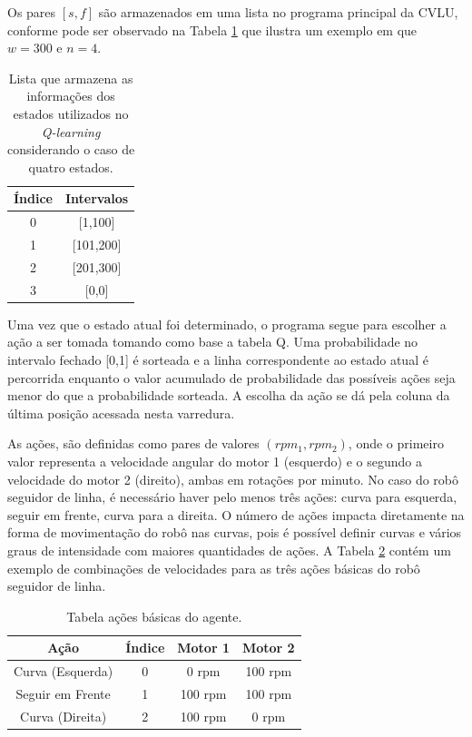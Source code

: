 \documentclass[a4paper]{ifacconf}
\begin{document}
Os pares $[s,f]$ são armazenados em uma lista no programa principal da CVLU, conforme pode ser observado na Tabela \ref{tab:statesOnMemory} que ilustra um exemplo em que $w = 300$ e $n = 4$.

\begin{table}
\centering
\ABNTEXfontereduzida
\caption{Lista que armazena as informações dos estados utilizados no \textit{Q-learning} considerando o caso de quatro estados.} \label{tab:statesOnMemory}
\begin{tabular}{cc}
Índice & Intervalos\\ \hline
0 & [1,100]\\ 
1 & [101,200]\\ 
2 & [201,300] \\ 
3 & [0,0]\\ \hline
\end{tabular}
\end{table}

Uma vez que o estado atual foi determinado, o programa segue para escolher a ação a ser tomada tomando como base a tabela Q. Uma probabilidade no intervalo fechado [0,1] é sorteada e a linha correspondente ao estado atual é percorrida enquanto o valor acumulado de probabilidade das possíveis ações seja menor do que a probabilidade sorteada. A escolha da ação se dá pela coluna da última posição acessada nesta varredura.

As ações, são definidas como pares de valores ${(rpm_1,rpm_2)}$, onde o primeiro valor representa a velocidade angular do motor 1 (esquerdo) e o segundo a velocidade do motor 2 (direito), ambas em rotações por minuto. No caso do robô seguidor de linha, é necessário haver pelo menos três ações: curva para esquerda, seguir em frente, curva para a direita. O número de ações impacta diretamente na forma de movimentação do robô nas curvas, pois é possível definir curvas e vários graus de intensidade com maiores quantidades de ações. A Tabela \ref{tab:basicActions} contém um exemplo de combinações de velocidades para as três ações básicas do robô seguidor de linha.

\begin{table}
\centering
\ABNTEXfontereduzida
\caption{Tabela ações básicas do agente.} \label{tab:basicActions}
\begin{tabular}{cccc}
Ação & Índice & Motor 1 & Motor 2\\ \hline 
Curva (Esquerda) & 0 & 0 rpm & 100 rpm\\ 
Seguir em Frente & 1 & 100 rpm & 100 rpm\\
Curva (Direita) & 2 & 100 rpm & 0 rpm\\ \hline
\end{tabular}
\end{table}
\end{document}

